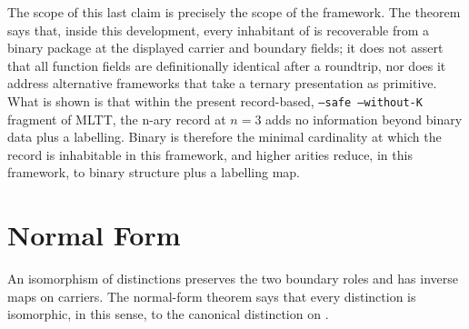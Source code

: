 \documentclass[11pt]{article}
\begin{document}
The scope of this last claim is precisely the scope of the framework.
The theorem says that, inside this development, every inhabitant of
  is recoverable from a binary
package at the displayed carrier and boundary fields; it does not
assert that all function fields are definitionally identical after a
roundtrip, nor does it address alternative frameworks that take a
ternary presentation as primitive.  What is shown is that within the
present record-based, \texttt{--safe --without-K} fragment of MLTT, the
n-ary record at $n=3$ adds no information beyond binary data plus a
labelling.  Binary is therefore the minimal cardinality at which the
 record is inhabitable in this framework, and
higher arities reduce, in this framework, to binary structure plus a
labelling map.

\section{Normal Form}

An isomorphism of distinctions preserves the two boundary roles and has
inverse maps on carriers.  The normal-form theorem says that every
distinction is isomorphic, in this sense, to the canonical distinction
on .
\end{document}
